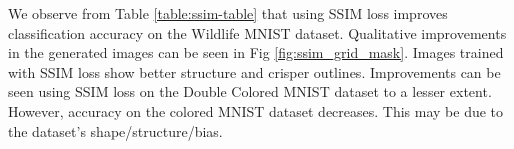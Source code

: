 We observe from Table \ref{table:ssim-table} that using SSIM \cite{wang2004image} loss improves classification accuracy on the Wildlife MNIST dataset. Qualitative improvements in the generated images can be seen in Fig \ref{fig:ssim_grid_mask}. Images trained with SSIM \cite{wang2004image} loss show better structure and crisper outlines. Improvements can be seen using SSIM \cite{wang2004image} loss on the  Double Colored MNIST dataset to a lesser extent. However, accuracy on the colored MNIST dataset decreases. This may be due to the dataset's shape/structure/bias.


